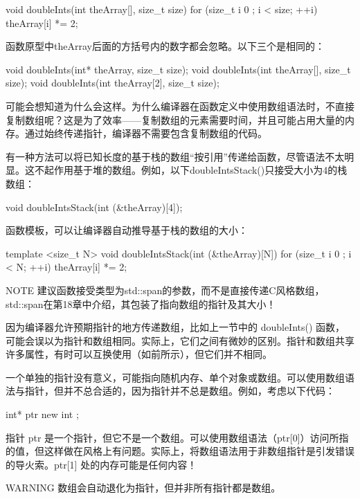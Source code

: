 \begin{cpp}
void doubleInts(int theArray[], size_t size)
{
    for (size_t i { 0 }; i < size; ++i) { theArray[i] *= 2; }
}
\end{cpp}

函数原型中theArray后面的方括号内的数字都会忽略。以下三个是相同的：

\begin{cpp}
void doubleInts(int* theArray, size_t size);
void doubleInts(int theArray[], size_t size);
void doubleInts(int theArray[2], size_t size);
\end{cpp}

可能会想知道为什么会这样。为什么编译器在函数定义中使用数组语法时，不直接复制数组呢？这是为了效率——复制数组的元素需要时间，并且可能占用大量的内存。通过始终传递指针，编译器不需要包含复制数组的代码。

有一种方法可以将已知长度的基于栈的数组“按引用”传递给函数，尽管语法不太明显。这不起作用基于堆的数组。例如，以下doubleIntsStack()只接受大小为4的栈数组：

\begin{cpp}
void doubleIntsStack(int (&theArray)[4]);
\end{cpp}

函数模板，可以让编译器自动推导基于栈的数组的大小：

\begin{cpp}
template <size_t N>
void doubleIntsStack(int (&theArray)[N])
{
    for (size_t i { 0 }; i < N; ++i) { theArray[i] *= 2; }
}
\end{cpp}

\begin{myNotic}{NOTE}
建议函数接受类型为std::span的参数，而不是直接传递C风格数组，std::span在第18章中介绍，其包装了指向数组的指针及其大小！
\end{myNotic}


因为编译器允许预期指针的地方传递数组，比如上一节中的 doubleInts() 函数，可能会误以为指针和数组相同。实际上，它们之间有微妙的区别。指针和数组共享许多属性，有时可以互换使用（如前所示），但它们并不相同。

一个单独的指针没有意义，可能指向随机内存、单个对象或数组。可以使用数组语法与指针，但并不总合适的，因为指针并不总是数组。例如，考虑以下代码：

\begin{cpp}
int* ptr { new int };
\end{cpp}

指针 ptr 是一个指针，但它不是一个数组。可以使用数组语法（ptr[0]）访问所指的值，但这样做在风格上有问题。实际上，将数组语法用于非数组指针是引发错误的导火索。ptr[1] 处的内存可能是任何内容！

\begin{myWarning}{WARNING}
数组会自动退化为指针，但并非所有指针都是数组。
\end{myWarning}











